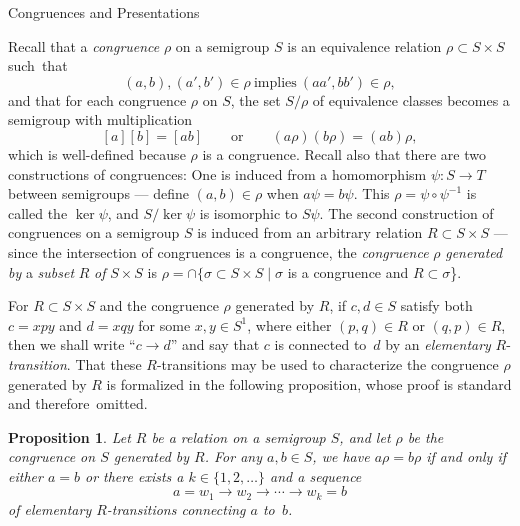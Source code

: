\documentclass{surv-l}
\numberwithin{equation}{section}
\numberwithin{table}{section}
\numberwithin{figure}{section}
\newtheorem{proposition}[equation]{Proposition}
\theoremstyle{definition}
\begin{document}
\begin{center}
Congruences and Presentations
\end{center}

Recall that a \emph{congruence} $\rho$ on a
semigroup $S$ is an equivalence relation $\rho\subset S\times S$
such~that
\[
(a, b), (a', b')\in\rho\ \mathrm{implies}\ (aa', bb')\in\rho,
\]
and that for each congruence $\rho$ on $S$, the set $S/\rho$ of
equivalence classes becomes a semigroup with multiplication
\[
[a][b]=[ab]\qquad \mathrm{or}\qquad (a\rho)(b\rho)=(ab)\rho,
\]
which is well-defined because $\rho$ is a congruence. Recall also
that there are two constructions of
congruences: One is induced from a homomorphism
$\psi : S\rightarrow T$ between semigroups
--- define $(a,b)\in\rho$ when $a\psi=b\psi$. This $\rho=\psi
\circ \psi^{-1}$ is called the $\ker \psi$, and
$S/\ker \psi$ is isomorphic to $S\psi$. The second
construction of congruences on a semigroup $S$ is induced from an
arbitrary relation $R\subset S \times S$ --- since the
intersection of congruences is a congruence, the \emph{congruence}
$\rho$ \emph{generated by} a
\emph{subset} $R$ \emph{of} $S\times S$ is
$\rho=\cap\{\sigma\subset S\times S\mid \sigma$ is a
congruence and $R\subset\sigma$\}.

For $R\subset S\times S$ and the congruence $\rho$
generated by $R$, if $c, d\in S$ satisfy both $c=xpy$ and
$d=xqy$ for some $x, y\in S^{1}$, where either $(p, q)\in R$ or
$(q,p)\in R$, then we shall write ``$c\rightarrow d$'' and say
that $c$ is connected to~$d$ by an \emph{elementary}
$R$-\emph{transition}. That these $R$-transitions may be used to
characterize the congruence $\rho$ generated by $R$ is formalized
in the following proposition, whose proof is standard and
therefore~omitted.

\setcounter{equation}{2}
\begin{proposition}\label{prop9.42.3}
Let $R$ be a relation on a semigroup $S$, and let $\rho$ be the
congruence on $S$ generated by $R$. For any $a, b\in S$, we have
$a\rho=b\rho$ if and only if either $a=b$ or there exists a
$k\in\{1,2,\ldots\}$ and a sequence
\[
a=w_{1}\rightarrow w_{2}\rightarrow\cdots\rightarrow w_{k}=b
\]
of elementary $R$-transitions
connecting $a$ to~$b$.
\end{proposition}
\end{document}
